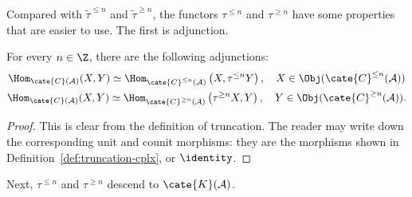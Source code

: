 Compared with $\tilde{\tau}^{\leq n}$ and $\tilde{\tau}^{\geq n}$, the
functors $\tau^{\leq n}$ and $\tau^{\geq n}$ have some properties that are
easier to use. The first is adjunction.

\begin{proposition}\label{prop:truncation-adjunction}
	For every $n \in \Z$, there are the following adjunctions:
	\begin{gather*}
		\Hom_{\cate{C}(\mathcal{A})}(X, Y) \simeq \Hom_{\cate{C}^{\leq n}(\mathcal{A})}\left(X, \tau^{\leq n} Y \right), \quad X \in \Obj(\cate{C}^{\leq n}(\mathcal{A})) \\ \Hom_{\cate{C}(\mathcal{A})}(X, Y) \simeq \Hom_{\cate{C}^{\geq n}(\mathcal{A})}\left(\tau^{\geq n} X, Y \right), \quad Y \in \Obj(\cate{C}^{\geq n}(\mathcal{A})).
	\end{gather*}
\end{proposition}
\begin{proof}
	This is clear from the definition of truncation. The reader may write down
	the corresponding unit and counit morphisms: they are the morphisms shown
	in Definition~\ref{def:truncation-cplx}, or $\identity$.
\end{proof}

Next, $\tau^{\leq n}$ and $\tau^{\geq n}$ descend to
$\cate{K}(\mathcal{A})$.

